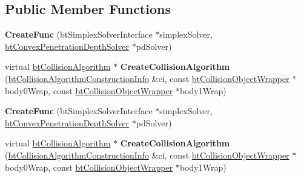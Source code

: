 \subsection*{Public Member Functions}
\begin{DoxyCompactItemize}
\item 
\mbox{\label{structbtConvex2dConvex2dAlgorithm_1_1CreateFunc_a586664288c20c127a63f737d68914270}} 
{\bfseries Create\+Func} (bt\+Simplex\+Solver\+Interface $\ast$simplex\+Solver, \hyperlink{classbtConvexPenetrationDepthSolver}{bt\+Convex\+Penetration\+Depth\+Solver} $\ast$pd\+Solver)
\item 
\mbox{\label{structbtConvex2dConvex2dAlgorithm_1_1CreateFunc_af99f63f7001eaff1010da77ae469cf65}} 
virtual \hyperlink{classbtCollisionAlgorithm}{bt\+Collision\+Algorithm} $\ast$ {\bfseries Create\+Collision\+Algorithm} (\hyperlink{structbtCollisionAlgorithmConstructionInfo}{bt\+Collision\+Algorithm\+Construction\+Info} \&ci, const \hyperlink{structbtCollisionObjectWrapper}{bt\+Collision\+Object\+Wrapper} $\ast$body0\+Wrap, const \hyperlink{structbtCollisionObjectWrapper}{bt\+Collision\+Object\+Wrapper} $\ast$body1\+Wrap)
\item 
\mbox{\label{structbtConvex2dConvex2dAlgorithm_1_1CreateFunc_a586664288c20c127a63f737d68914270}} 
{\bfseries Create\+Func} (bt\+Simplex\+Solver\+Interface $\ast$simplex\+Solver, \hyperlink{classbtConvexPenetrationDepthSolver}{bt\+Convex\+Penetration\+Depth\+Solver} $\ast$pd\+Solver)
\item 
\mbox{\label{structbtConvex2dConvex2dAlgorithm_1_1CreateFunc_af99f63f7001eaff1010da77ae469cf65}} 
virtual \hyperlink{classbtCollisionAlgorithm}{bt\+Collision\+Algorithm} $\ast$ {\bfseries Create\+Collision\+Algorithm} (\hyperlink{structbtCollisionAlgorithmConstructionInfo}{bt\+Collision\+Algorithm\+Construction\+Info} \&ci, const \hyperlink{structbtCollisionObjectWrapper}{bt\+Collision\+Object\+Wrapper} $\ast$body0\+Wrap, const \hyperlink{structbtCollisionObjectWrapper}{bt\+Collision\+Object\+Wrapper} $\ast$body1\+Wrap)
\end{DoxyCompactItemize}
